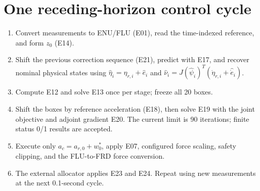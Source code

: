 \documentclass[11pt,a4paper]{article}
\begin{document}
\section{One receding-horizon control cycle}
\begin{enumerate}
\item Convert measurements to ENU/FLU (E01), read the time-indexed reference,
and form $z_0$ (E14).
\item Shift the previous correction sequence (E21), predict with E17, and
recover nominal physical states using
$\hat\eta_i=\eta_{r,i}+\hat e_i$ and
$\hat\nu_i=J(\hat\psi_i)^T(\dot\eta_{r,i}+\widehat{\dot e}_i)$.
\item Compute E12 and solve E13 once per stage; freeze all 20 boxes.
\item Shift the boxes by reference acceleration (E18), then solve E19
with the joint objective and adjoint gradient E20. The current limit is
90 iterations; finite status 0/1 results are accepted.
\item Execute only $a_c=a_{r,0}+w_0^*$, apply E07, configured force scaling,
safety clipping, and the FLU-to-FRD force conversion.
\item The external allocator applies E23 and E24. Repeat using new
measurements at the next 0.1-second cycle.
\end{enumerate}
\end{document}
